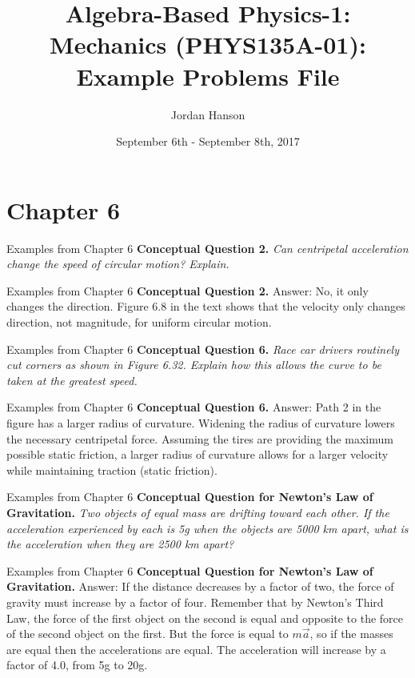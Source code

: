 \documentclass{beamer}
\title{Algebra-Based Physics-1: Mechanics (PHYS135A-01): Example Problems File}
\date{September 6th - September 8th, 2017}
\author{Jordan Hanson}
\institute{Whittier College Department of Physics and Astronomy}
\begin{document}
\maketitle

\section{Chapter 6}

\begin{frame}{Examples from Chapter 6}
\textbf{Conceptual Question 2.} \textit{Can centripetal acceleration change the speed of circular motion?  Explain.}
\end{frame}

\begin{frame}{Examples from Chapter 6}
\textbf{Conceptual Question 2.} \alert{Answer:} No, it only changes the direction.  Figure 6.8 in the text shows that the velocity only changes direction, not magnitude, for uniform circular motion.
\end{frame}

\begin{frame}{Examples from Chapter 6}
\textbf{Conceptual Question 6.} \textit{Race car drivers routinely cut corners as shown in Figure 6.32. Explain how this allows the curve to be taken at the greatest speed.}
\end{frame}

\begin{frame}{Examples from Chapter 6}
\textbf{Conceptual Question 6.} \alert{Answer:} Path 2 in the figure has a larger radius of curvature.  Widening the radius of curvature lowers the necessary centripetal force.  Assuming the tires are providing the maximum possible static friction, a larger radius of curvature allows for a larger velocity while maintaining traction (static friction).
\end{frame}

\begin{frame}{Examples from Chapter 6}
\textbf{Conceptual Question for Newton's Law of Gravitation.} \textit{Two objects of equal mass are drifting toward each other.  If the acceleration experienced by each is 5g when the objects are 5000 km apart, what is the acceleration when they are 2500 km apart?}
\end{frame}

\begin{frame}{Examples from Chapter 6}
\textbf{Conceptual Question for Newton's Law of Gravitation.} \alert{Answer:} If the distance decreases by a factor of two, the force of gravity must increase by a factor of four.  Remember that by Newton's Third Law, the force of the first object on the second is equal and opposite to the force of the second object on the first.  But the force is equal to $m \vec{a}$, so if the masses are equal then the accelerations are equal.  The acceleration will increase by a factor of 4.0, from 5g to 20g.
\end{frame}
\end{document}
